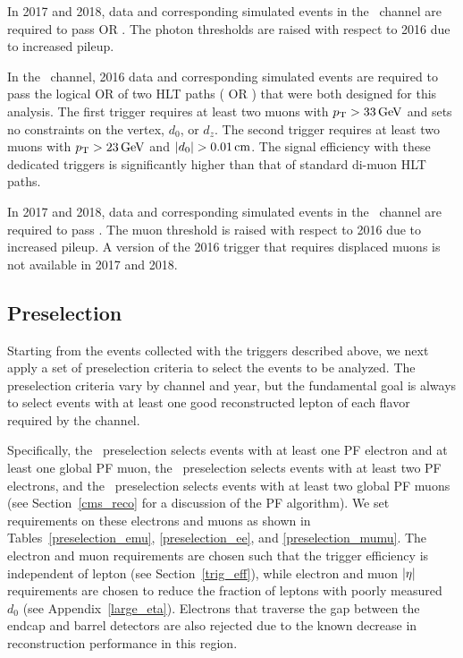 In 2017 and 2018, data and corresponding simulated events in the \Pe\Pe\ channel are required to pass  OR  . The photon \ET thresholds are raised with respect to 2016 due to increased pileup.

In the \Pgm\Pgm\ channel, 2016 data and corresponding simulated events are required to pass the logical OR of two HLT paths ( OR ) that were both designed for this analysis. The first trigger requires at least two muons with $\pt>\SI{33}{\GeV}$ and sets no constraints on the vertex, $d_0$, or $d_z$. The second trigger requires at least two muons with $\pt>\SI{23}{\GeV}$ and $\ad>\SI{0.01}{\cm}$. The signal efficiency with these dedicated triggers is significantly higher than that of standard di-muon HLT paths.

In 2017 and 2018, data and corresponding simulated events in the \Pgm\Pgm\ channel are required to pass . The muon \pt threshold is raised with respect to 2016 due to increased pileup. A version of the 2016 trigger that requires displaced muons is not available in 2017 and 2018.

\subsection{Preselection}
\label{preselection}
Starting from the events collected with the triggers described above, we next apply a set of preselection criteria to select the events to be analyzed. The preselection criteria vary by channel and year, but the fundamental goal is always to select events with at least one good reconstructed lepton of each flavor required by the channel. 

Specifically, the \Pe\Pgm\ preselection selects events with at least one PF electron and at least one global PF muon, the \Pe\Pe\ preselection selects events with at least two PF electrons, and the \Pgm\Pgm\ preselection selects events with at least two global PF muons (see Section~\ref{cms_reco} for a discussion of the PF algorithm). We set requirements on these electrons and muons as shown in Tables~\ref{preselection_emu}, \ref{preselection_ee}, and \ref{preselection_mumu}. The electron and muon \pt  requirements are chosen such that the trigger efficiency is independent of lepton \pt (see Section~\ref{trig_eff}), while electron and muon $\lvert \eta \rvert$ requirements are chosen to reduce the fraction of leptons with poorly measured $d_0$ (see Appendix~\ref{large_eta}). Electrons that traverse the gap between the endcap and barrel detectors are also rejected due to the known decrease in reconstruction performance in this region.

